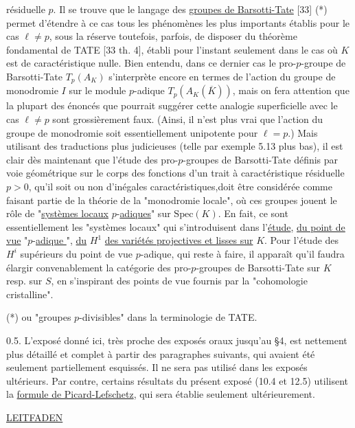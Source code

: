 résiduelle $p$. Il se trouve que le langage des \underline{groupes de Barsotti-Tate} [33] (*) permet d'étendre à ce cas tous les phénomènes les plus importants établis pour le cas $\ell \neq p$, sous la réserve toutefois, parfois, de disposer du théorème fondamental de TATE [33 th. 4], établi pour l'instant seulement dans le cas où $K$ est de caractéristique nulle. Bien entendu, dans ce dernier cas le pro-$p$-groupe de Barsotti-Tate $T_p(A_K)$ s'interprète encore en termes de l'action du groupe de monodromie $I$ sur le module $p$-adique $T_p(A_K(\overline{K}))$, mais on fera attention que la plupart des énoncés que pourrait suggérer cette analogie superficielle avec le cas $\ell \neq p$ sont grossièrement faux. (Ainsi, il n'est plus vrai que l'action du groupe de monodromie soit essentiellement unipotente pour $\ell = p$.) Mais utilisant des traductions plus judicieuses (telle par exemple 5.13 plus bas), il est clair dès maintenant que l'étude des pro-$p$-groupes de Barsotti-Tate définis par voie géométrique sur le corps des fonctions d'un trait à caractéristique résiduelle $p > 0$, qu'il soit ou non d'inégales caractéristiques,doit être considérée comme faisant partie de la théorie de la "monodromie locale", où ces groupes jouent le rôle de "\underline{systèmes locaux} $p$-\underline{adiques}" sur $\mathrm{Spec}(K)$. En fait, ce sont essentiellement les "systèmes locaux" qui s'introduisent dans l'\underline{étude}, \underline{du point de vue} "$p$-\underline{adique }", \underline{du} $H^1$ \underline{des variétés projectives et lisses sur} $K$. Pour l'étude des $H^i$ supérieurs du point de vue $p$-adique, qui reste à faire, il apparaît qu'il faudra élargir convenablement la catégorie des pro-$p$-groupes de Barsotti-Tate sur $K$ resp. sur $S$, en s'inspirant des points de vue fournis par la "cohomologie cristalline".

(*) ou "groupes $p$-divisibles" dans la terminologie de TATE.



0.5. L'exposé donné ici, très proche des exposés oraux jusqu'au \S 4, est nettement plus détaillé et complet à partir des paragraphes suivants, qui avaient été seulement partiellement esquissés. Il ne sera pas utilisé dans les exposés ultérieurs. Par contre, certains résultats du présent exposé (10.4 et 12.5) utilisent la \underline{formule de Picard-Lefschetz}, qui sera établie seulement ultérieurement.


\underline{LEITFADEN}

